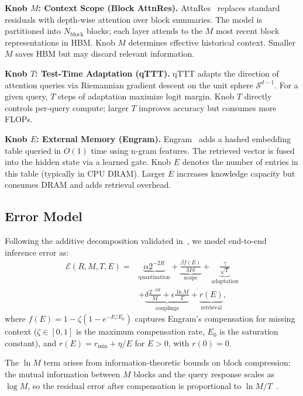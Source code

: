 \documentclass[11pt,a4paper]{article}
\theoremstyle{plain}
\theoremstyle{definition}
\begin{document}
\textbf{Knob $M$: Context Scope (Block AttnRes).} AttnRes~\cite{kimi2026} replaces standard residuals with depth-wise attention over block summaries. The model is partitioned into $N_{\text{block}}$ blocks; each layer attends to the $M$ most recent block representations in HBM. Knob $M$ determines effective historical context. Smaller $M$ saves HBM but may discard relevant information.

\textbf{Knob $T$: Test-Time Adaptation (qTTT).} qTTT adapts the direction of attention queries via Riemannian gradient descent on the unit sphere $\mathcal{S}^{d-1}$. For a given query, $T$ steps of adaptation maximize logit margin. Knob $T$ directly controls per-query compute; larger $T$ improves accuracy but consumes more FLOPs.

\textbf{Knob $E$: External Memory (Engram).} Engram~\cite{cheng2026} adds a hashed embedding table queried in $O(1)$ time using n-gram features. The retrieved vector is fused into the hidden state via a learned gate. Knob $E$ denotes the number of entries in this table (typically in CPU DRAM). Larger $E$ increases knowledge capacity but consumes DRAM and adds retrieval overhead.

\subsection{Error Model}
Following the additive decomposition validated in~\cite{adn2026}, we model end-to-end inference error as:
\begin{equation}\label{eq:error}
\begin{aligned}
\mathcal{E}(R,M,T,E) = &\underbrace{\alpha 2^{-2R}}_{\text{quantization}} + \underbrace{\frac{\beta f(E)}{MS}}_{\text{scope}} + \underbrace{\frac{\gamma}{\sqrt{T}}}_{\text{adaptation}} \\
&+ \underbrace{\delta\frac{2^{-2R}}{M} + \epsilon\frac{\ln M}{T}}_{\text{couplings}} + \underbrace{r(E)}_{\text{retrieval}},
\end{aligned}
\end{equation}
where $f(E) = 1 - \zeta(1 - e^{-E/E_0})$ captures Engram's compensation for missing context ($\zeta\in[0,1]$ is the maximum compensation rate, $E_0$ is the saturation constant), and $r(E) = r_{\min} + \eta/E$ for $E>0$, with $r(0)=0$.

The $\ln M$ term arises from information-theoretic bounds on block compression: the mutual information between $M$ blocks and the query response scales as $\log M$, so the residual error after compensation is proportional to $\ln M / T$~\cite{cover1999}.
\end{document}
